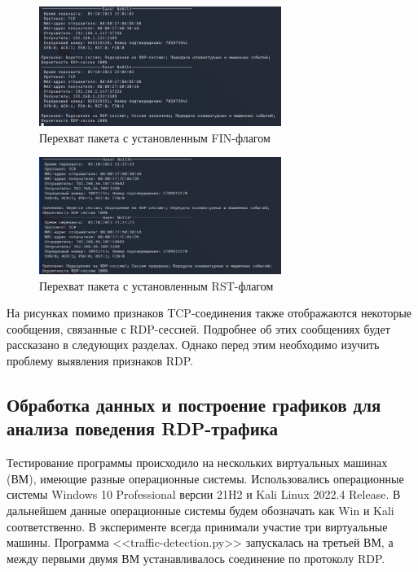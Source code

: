 \documentclass[bachelor, och, coursework]{SCWorks}
\begin{document}
\begin{figure}[H]
  \centering
  \includegraphics[width=0.7\textwidth]{photo/ses-fin.jpg}
  \caption{Перехват пакета с установленным FIN-флагом}
  \label{ses-fin}
\end{figure}


\begin{figure}[H]
  \centering
  \includegraphics[width=0.7\textwidth]{photo/ses-rst.jpg}
  \caption{Перехват пакета с установленным RST-флагом}
  \label{ses-rst}
\end{figure}

На рисунках помимо признаков TCP-соединения также отображаются некоторые сообщения, связанные с RDP-сессией. 
Подробнее об этих сообщениях будет рассказано в следующих разделах. Однако перед этим необходимо изучить 
проблему выявления признаков RDP.

\subsection{Обработка данных и построение графиков для анализа поведения RDP-трафика}

Тестирование программы происходило на нескольких виртуальных машинах (ВМ), имеющие разные операционные системы.
Использовались операционные системы Windows 10 Professional версии 21H2 и Kali Linux 2022.4 Release. В дальнейшем данные 
операционные системы будем обозначать как Win и Kali соответственно. В эксперименте всегда принимали участие три виртуальные машины.
Программа <<traffic-detection.py>> запускалась на третьей ВМ, а между первыми двумя ВМ устанавливалось соединение по протоколу RDP.
\end{document}

